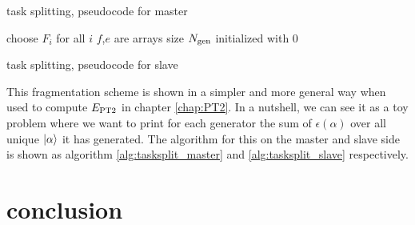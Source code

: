 \documentclass[./thesis.tex]{subfiles}
\begin{document}
\begin{algorithm}
        \caption{task splitting, pseudocode for master}
        \label{alg:tasksplit_master}
        choose $F_i$ for all $i$\;
        $f$,$e$ are arrays size ${N_\text{gen}}$ initialized with $0$ \;
\end{algorithm}

\begin{algorithm}
        \caption{task splitting, pseudocode for slave}
        \label{alg:tasksplit_slave}
\end{algorithm}

This fragmentation scheme is shown in a simpler and more general way when used to compute $E_\text{PT2}$ in chapter \ref{chap:PT2}. In a nutshell, we can see it as a toy problem where we want to print for each generator the sum of $\epsilon(\alpha)$ over all unique ${\ket{\alpha}}$ it has generated. The algorithm for this on the master and slave side is shown as algorithm \ref{alg:tasksplit_master} and \ref{alg:tasksplit_slave} respectively.

\section{conclusion}
\end{document}
